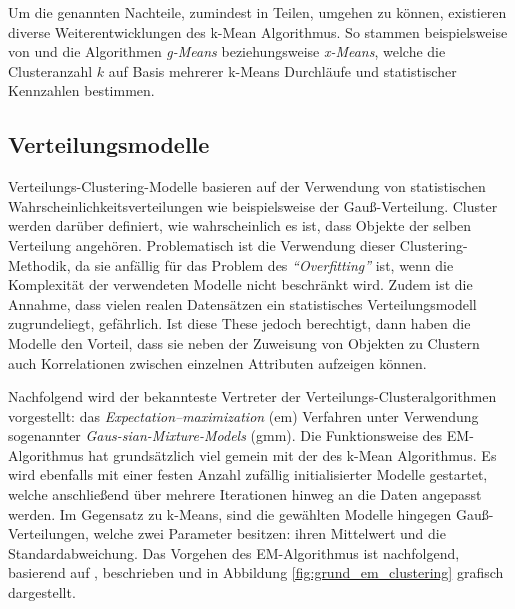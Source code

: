 Um die genannten Nachteile, zumindest in Teilen, umgehen zu können, existieren diverse Weiterentwicklungen des k-Mean
Algorithmus. So stammen beispielsweise von \cite[]{Hamerly} und \cite[]{Pelleg} die Algorithmen \textit{g-Means}
beziehungsweise \textit{x-Means}, welche die Clusteranzahl $k$ auf Basis mehrerer k-Means Durchläufe und
statistischer Kennzahlen bestimmen.

\subsection{Verteilungsmodelle}
\label{sec:grund_distribution_clustering}

Verteilungs-Clustering-Modelle basieren auf der Verwendung von statistischen Wahrscheinlichkeitsverteilungen wie
beispielsweise der Gauß-Verteilung. Cluster werden darüber definiert, wie wahrscheinlich es ist, dass Objekte
der selben Verteilung angehören. Problematisch ist die Verwendung dieser Clustering-Methodik, da sie anfällig für
das Problem des \textit{``Overfitting''} ist, wenn die Komplexität der verwendeten Modelle nicht beschränkt wird.
Zudem ist die Annahme, dass vielen realen Datensätzen ein statistisches Verteilungsmodell zugrundeliegt, gefährlich.
Ist diese These jedoch berechtigt, dann haben die Modelle den Vorteil, dass sie neben der Zuweisung von Objekten zu Clustern
auch Korrelationen zwischen einzelnen Attributen aufzeigen können. \cite[]{AndersDrachen2014}

Nachfolgend wird der bekannteste Vertreter der Verteilungs-Clusteralgorithmen vorgestellt:
das \textit{Expectation–maximization} (\acrshort*{em}) Verfahren unter Verwendung sogenannter \textit{Gaus-sian-Mixture-Models} (\acrshort*{gmm}).
Die Funktionsweise des EM-Algorithmus hat grundsätzlich viel gemein mit der des k-Mean Algorithmus.
Es wird ebenfalls mit einer festen Anzahl zufällig initialisierter Modelle gestartet, welche anschließend über mehrere Iterationen
hinweg an die Daten angepasst werden. Im Gegensatz zu k-Means, sind die gewählten Modelle hingegen Gauß-Verteilungen,
welche zwei Parameter besitzen: ihren Mittelwert und die Standardabweichung.
Das Vorgehen des EM-Algorithmus ist nachfolgend, basierend auf \cite[]{GeorgeSeif2018}, beschrieben und in
Abbildung \ref{fig:grund_em_clustering} grafisch dargestellt.

